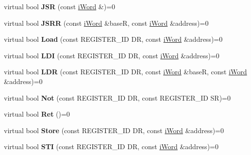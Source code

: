 \begin{DoxyCompactItemize}
\item 
\hypertarget{classiSimulator_ab30229a9093f96ae8f49e4a82b2f0a96}{
virtual bool {\bfseries JSR} (const \hyperlink{classiWord}{iWord} \&)=0}
\label{classiSimulator_ab30229a9093f96ae8f49e4a82b2f0a96}

\item 
\hypertarget{classiSimulator_a9f4b0281a3f3d7f0a17f6163926af0fe}{
virtual bool {\bfseries JSRR} (const \hyperlink{classiWord}{iWord} \&baseR, const \hyperlink{classiWord}{iWord} \&address)=0}
\label{classiSimulator_a9f4b0281a3f3d7f0a17f6163926af0fe}

\item 
\hypertarget{classiSimulator_aebed4efd384ed7a2058a331abb443de3}{
virtual bool {\bfseries Load} (const REGISTER\_\-ID DR, const \hyperlink{classiWord}{iWord} \&address)=0}
\label{classiSimulator_aebed4efd384ed7a2058a331abb443de3}

\item 
\hypertarget{classiSimulator_ac9d482f3e08540a0e753ac07ad184f0c}{
virtual bool {\bfseries LDI} (const REGISTER\_\-ID DR, const \hyperlink{classiWord}{iWord} \&address)=0}
\label{classiSimulator_ac9d482f3e08540a0e753ac07ad184f0c}

\item 
\hypertarget{classiSimulator_a3008e18326b41cdd8226da07b9409b62}{
virtual bool {\bfseries LDR} (const REGISTER\_\-ID DR, const \hyperlink{classiWord}{iWord} \&baseR, const \hyperlink{classiWord}{iWord} \&address)=0}
\label{classiSimulator_a3008e18326b41cdd8226da07b9409b62}

\item 
\hypertarget{classiSimulator_a8d418321f4eef73d5cf3b17ac64c0ba8}{
virtual bool {\bfseries Not} (const REGISTER\_\-ID DR, const REGISTER\_\-ID SR)=0}
\label{classiSimulator_a8d418321f4eef73d5cf3b17ac64c0ba8}

\item 
\hypertarget{classiSimulator_a272e6a7baebbb777bdeb60d67e4fcb17}{
virtual bool {\bfseries Ret} ()=0}
\label{classiSimulator_a272e6a7baebbb777bdeb60d67e4fcb17}

\item 
\hypertarget{classiSimulator_a8b43cb8d1da6eefc49d629bf744837d3}{
virtual bool {\bfseries Store} (const REGISTER\_\-ID DR, const \hyperlink{classiWord}{iWord} \&address)=0}
\label{classiSimulator_a8b43cb8d1da6eefc49d629bf744837d3}

\item 
\hypertarget{classiSimulator_aa434d5add2b2b98ad301a1c842fb158f}{
virtual bool {\bfseries STI} (const REGISTER\_\-ID DR, const \hyperlink{classiWord}{iWord} \&address)=0}
\label{classiSimulator_aa434d5add2b2b98ad301a1c842fb158f}


\end{DoxyCompactItemize}
